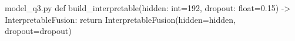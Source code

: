 \documentclass[bwprint]{gmcmthesis}
\begin{document}
\begin{appendices}
\begin{Python}{model\_q3.py}
def build_interpretable(hidden: int=192, dropout: float=0.15) -> InterpretableFusion:
    return InterpretableFusion(hidden=hidden, dropout=dropout)
\end{Python}

\end{appendices}
\end{document}
